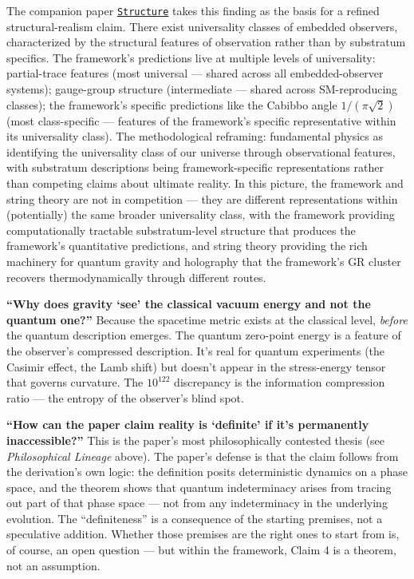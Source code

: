 \documentclass[
]{article}
\begin{document}
The companion paper \href{Structure.md}{\texttt{Structure}} takes this
finding as the basis for a refined structural-realism claim. There exist
universality classes of embedded observers, characterized by the
structural features of observation rather than by substratum specifics.
The framework's predictions live at multiple levels of universality:
partial-trace features (most universal --- shared across all
embedded-observer systems); gauge-group structure (intermediate ---
shared across SM-reproducing classes); the framework's specific
predictions like the Cabibbo angle \(1/(\pi\sqrt{2})\) (most
class-specific --- features of the framework's specific representative
within its universality class). The methodological reframing:
fundamental physics as identifying the universality class of our
universe through observational features, with substratum descriptions
being framework-specific representations rather than competing claims
about ultimate reality. In this picture, the framework and string theory
are not in competition --- they are different representations within
(potentially) the same broader universality class, with the framework
providing computationally tractable substratum-level structure that
produces the framework's quantitative predictions, and string theory
providing the rich machinery for quantum gravity and holography that the
framework's GR cluster recovers thermodynamically through different
routes.

\textbf{``Why does gravity `see' the classical vacuum energy and not the
quantum one?''} Because the spacetime metric exists at the classical
level, \emph{before} the quantum description emerges. The quantum
zero-point energy is a feature of the observer's compressed description.
It's real for quantum experiments (the Casimir effect, the Lamb shift)
but doesn't appear in the stress-energy tensor that governs curvature.
The \(10^{122}\) discrepancy is the information compression ratio ---
the entropy of the observer's blind spot.

\textbf{``How can the paper claim reality is `definite' if it's
permanently inaccessible?''} This is the paper's most philosophically
contested thesis (see \emph{Philosophical Lineage} above). The paper's
defense is that the claim follows from the derivation's own logic: the
definition posits deterministic dynamics on a phase space, and the
theorem shows that quantum indeterminacy arises from tracing out part of
that phase space --- not from any indeterminacy in the underlying
evolution. The ``definiteness'' is a consequence of the starting
premises, not a speculative addition. Whether those premises are the
right ones to start from is, of course, an open question --- but within
the framework, Claim 4 is a theorem, not an assumption.
\end{document}
